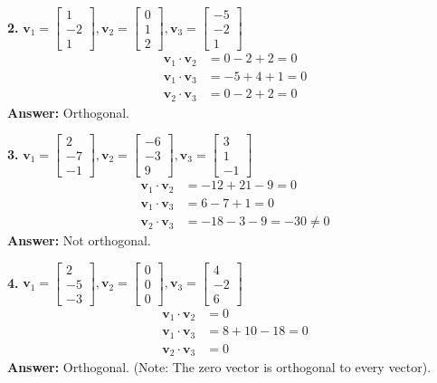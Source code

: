 \documentclass[11pt, letterpaper]{article}
\theoremstyle{definition}
\theoremstyle{remark}
\begin{document}
\textbf{2.} $\mathbf{v}_1 = \begin{bmatrix} 1 \\ -2 \\ 1 \end{bmatrix}, \mathbf{v}_2 = \begin{bmatrix} 0 \\ 1 \\ 2 \end{bmatrix}, \mathbf{v}_3 = \begin{bmatrix} -5 \\ -2 \\ 1 \end{bmatrix}$
\begin{align*}
    \mathbf{v}_1 \cdot \mathbf{v}_2 &= 0 - 2 + 2 = 0 \\
    \mathbf{v}_1 \cdot \mathbf{v}_3 &= -5 + 4 + 1 = 0 \\
    \mathbf{v}_2 \cdot \mathbf{v}_3 &= 0 - 2 + 2 = 0
\end{align*}
\textbf{Answer:} Orthogonal.

\textbf{3.} $\mathbf{v}_1 = \begin{bmatrix} 2 \\ -7 \\ -1 \end{bmatrix}, \mathbf{v}_2 = \begin{bmatrix} -6 \\ -3 \\ 9 \end{bmatrix}, \mathbf{v}_3 = \begin{bmatrix} 3 \\ 1 \\ -1 \end{bmatrix}$
\begin{align*}
    \mathbf{v}_1 \cdot \mathbf{v}_2 &= -12 + 21 - 9 = 0 \\
    \mathbf{v}_1 \cdot \mathbf{v}_3 &= 6 - 7 + 1 = 0 \\
    \mathbf{v}_2 \cdot \mathbf{v}_3 &= -18 - 3 - 9 = -30 \neq 0
\end{align*}
\textbf{Answer:} Not orthogonal.

\textbf{4.} $\mathbf{v}_1 = \begin{bmatrix} 2 \\ -5 \\ -3 \end{bmatrix}, \mathbf{v}_2 = \begin{bmatrix} 0 \\ 0 \\ 0 \end{bmatrix}, \mathbf{v}_3 = \begin{bmatrix} 4 \\ -2 \\ 6 \end{bmatrix}$
\begin{align*}
    \mathbf{v}_1 \cdot \mathbf{v}_2 &= 0 \\
    \mathbf{v}_1 \cdot \mathbf{v}_3 &= 8 + 10 - 18 = 0 \\
    \mathbf{v}_2 \cdot \mathbf{v}_3 &= 0
\end{align*}
\textbf{Answer:} Orthogonal. (Note: The zero vector is orthogonal to every vector).
\end{document}

